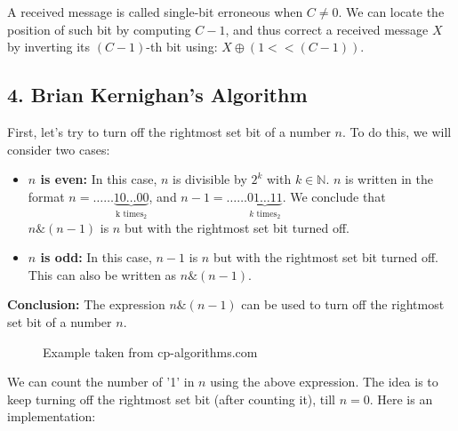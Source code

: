 \documentclass[11pt]{article}
\begin{document}
A received message is called single-bit erroneous when $C \neq 0$. We can locate the position of such bit by computing $C - 1$, and thus correct a received message $X$ by inverting its $(C - 1)$-th bit using: $X \oplus (1 << (C - 1))$.

\subsection*{4. Brian Kernighan's Algorithm}
First, let's try to turn off the rightmost set bit of a number $n$. To do this, we will consider two cases:

\begin{itemize}
    \item \textbf{$n$ is even:} In this case, $n$ is divisible by $2^k$ with $k \in \mathbb{N}$. $n$ is written in the format $n = \ldots\ldots\underbrace{10\ldots00}_{\text{k times}}_2$, and $n-1 = \ldots\ldots\underbrace{01\ldots11}_{\text{$k$ times}}_2$. 
    \newline
    We conclude that $n \& (n - 1)$ is $n$ but with the rightmost set bit turned off.
    \item \textbf{$n$ is odd:} In this case, $n-1$ is $n$ but with the rightmost set bit turned off. This can also be written as $n \& (n - 1)$.
\end{itemize}
\newline
\textbf{Conclusion:} The expression $n \& (n - 1)$ can be used to turn off the rightmost set bit of a number $n$.
\begin{figure}[H]
    \centering
    \caption{Example taken from cp-algorithms.com}
    \label{fig:example_number}
\end{figure}

We can count the number of '1' in $n$ using the above expression. The idea is to keep turning off the rightmost set bit (after counting it), till $n = 0$. Here is an implementation:
\end{document}
